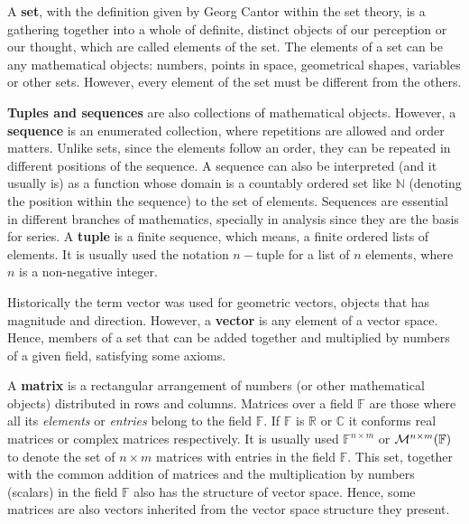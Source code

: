 A \textbf{set}, with the definition given by Georg Cantor within the set theory, 
is a gathering together into a whole of definite, distinct objects of our perception or our thought, 
which are called elements of the set.
The elements of a set can be any mathematical objects: numbers, points in space, geometrical shapes, variables or other sets.
However, every element of the set must be different from the others.

\textbf{Tuples and sequences} are also collections of mathematical objects.
However, a \textbf{sequence} is an enumerated collection, where repetitions are allowed and order matters.
Unlike sets, since the elements follow an order, they can be repeated in different positions of the sequence.
A sequence can also be interpreted (and it usually is) as a function whose domain is a countably ordered set like $\mathbb{N}$ 
(denoting the position within the sequence) to the set of elements. 
Sequences are essential in different branches of mathematics, specially in analysis since they are 
the basis for series.
A \textbf{tuple} is a finite sequence, which means, a finite ordered lists of elements. 
It is usually used the notation $n-$tuple for a list of $n$ elements, where $n$ is a non-negative integer.

Historically the term vector was used for geometric vectors, objects that has magnitude and direction.
However, a \textbf{vector} is any element of a vector space. 
Hence, members of a set that can be added together and multiplied by numbers of a given field, satisfying some axioms.



A \textbf{matrix} is a rectangular arrangement of numbers (or other mathematical objects) distributed in rows and columns.
Matrices over a field $\mathbb{F}$ are those where all its \textit{elements} or \textit{entries} belong to the field $\mathbb{F}$.
If $\mathbb{F}$ is $\mathbb{R}$ or $\mathbb{C}$ it conforms real matrices or complex matrices respectively.
It is usually used $\mathbb{F}^{n\times m}$ or ${\cal{M}}^{n \times m} (\mathbb{F})$ to denote 
the set of $n\times m$ matrices with entries in the field $\mathbb{F}$. 
This set, together with the common addition of matrices and the multiplication by numbers (scalars) 
in the field $\mathbb{F}$ also has the structure of vector space. 
Hence, some matrices are also vectors inherited from the vector space structure they present.

